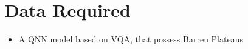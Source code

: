 \section{Data Required}
\begin{itemize}
    \item A QNN model based on VQA, that possess Barren Plateaus
\end{itemize}